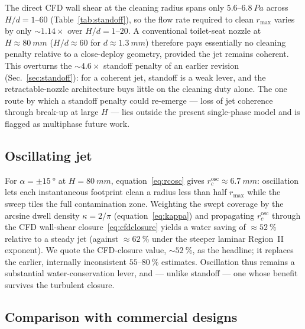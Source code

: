 \documentclass[aps,prfluids,reprint,amsmath,amssymb,floatfix]{revtex4-2}
\begin{document}
The direct CFD wall shear at the cleaning radius spans only
$5.6$--$\SI{6.8}{Pa}$ across $H/d = 1$--$60$ (Table~\ref{tab:standoff}), so
the flow rate required to clean $r_\mathrm{max}$ varies by only
$\sim 1.14\times$ over $H/d = 1$--$20$. A conventional toilet-seat nozzle at
$H \approx \SI{80}{mm}$ ($H/d \approx 60$ for $d \approx \SI{1.3}{mm}$)
therefore pays essentially no cleaning penalty relative to a close-deploy
geometry, provided the jet remains coherent. This overturns the $\sim 4.6\times$
standoff penalty of an earlier revision (Sec.~\ref{sec:standoff}): for a
coherent jet, standoff is a weak lever, and the retractable-nozzle
architecture buys little on the cleaning duty alone. The one route by which a
standoff penalty could re-emerge --- loss of jet coherence through break-up at
large $H$ --- lies outside the present single-phase model and is flagged as
multiphase future work.

\subsection{Oscillating jet}

For $\alpha = \pm\SI{15}{\degree}$ at $H = \SI{80}{mm}$,
equation~\eqref{eq:rcosc} gives $r_c^\mathrm{osc} \approx \SI{6.7}{mm}$:
oscillation lets each instantaneous footprint clean a radius less than half
$r_\mathrm{max}$ while the sweep tiles the full contamination zone. Weighting
the swept coverage by the arcsine dwell density $\kappa = 2/\pi$
(equation~\eqref{eq:kappa}) and propagating $r_c^\mathrm{osc}$ through the CFD
wall-shear closure~\eqref{eq:cfdclosure} yields a water saving of
$\approx \SI{52}{\percent}$ relative to a steady jet (against
$\approx \SI{62}{\percent}$ under the steeper laminar Region~II exponent).
We quote the CFD-closure value, $\sim\SI{52}{\percent}$, as the headline; it
replaces the earlier, internally inconsistent $55$--$\SI{80}{\percent}$
estimates. Oscillation thus remains a substantial water-conservation lever,
and --- unlike standoff --- one whose benefit survives the turbulent closure.

\subsection{Comparison with commercial designs}
\end{document}
